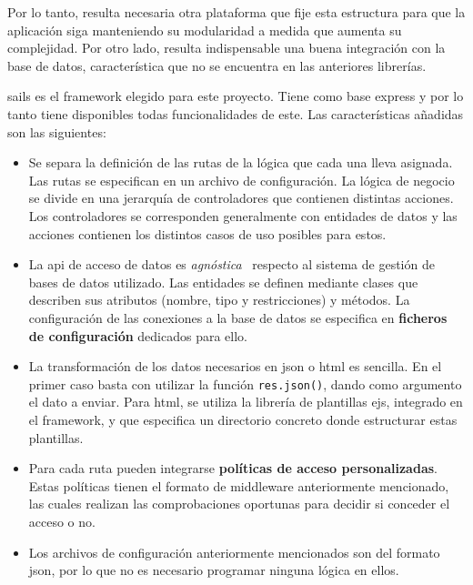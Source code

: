 \documentclass[main]{subfiles}
\begin{document}
Por lo tanto, resulta necesaria otra plataforma que fije esta estructura para que la aplicación siga manteniendo su modularidad a medida que aumenta su complejidad. Por otro lado, resulta indispensable una buena integración con la base de datos, característica que no se encuentra en las anteriores librerías.

\Gls{sails} es el \gls{framework} elegido para este proyecto. Tiene como base \gls{express} y por lo tanto tiene disponibles todas funcionalidades de este. Las características añadidas son las siguientes:

\begin{itemize}
  \item Se separa la definición de las rutas de la lógica que cada una lleva asignada. Las rutas se especifican en un archivo de configuración. La lógica de negocio se divide en una jerarquía de controladores que contienen distintas acciones. Los controladores se corresponden generalmente con entidades de datos y las acciones contienen los distintos casos de uso posibles para estos.
  \item La \gls{api} de acceso de datos es \emph{agnóstica}~\autocite{agnostic} respecto al sistema de gestión de bases de datos utilizado. Las entidades se definen mediante clases que describen sus atributos (nombre, tipo y restricciones) y métodos. La configuración de las conexiones a la base de datos se especifica en \textbf{ficheros de configuración} dedicados para ello.
  \item La transformación de los datos necesarios en \gls{json} o \gls{html} es sencilla. En el primer caso basta con utilizar la función \texttt{res.json()}, dando como argumento el dato a enviar. Para \gls{html}, se utiliza la librería de plantillas \gls{ejs}, integrado en el \gls{framework}, y que especifica un directorio concreto donde estructurar estas plantillas.
  \item Para cada ruta pueden integrarse \textbf{políticas de acceso personalizadas}. Estas políticas tienen el formato de \gls{middleware} anteriormente mencionado, las cuales realizan las comprobaciones oportunas para decidir si conceder el acceso o no.
  \item Los archivos de configuración anteriormente mencionados son del formato \gls{json}, por lo que no es necesario programar ninguna lógica en ellos.
\end{itemize}
\end{document}
